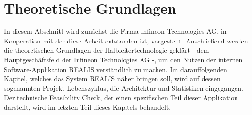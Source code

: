 \chapter{Theoretische Grundlagen}\label{Chap:TheoretischeGrundlagen}
In diesem Abschnitt wird zunächst die Firma Infineon Technologies AG, in Kooperation mit der diese Arbeit entstanden ist, vorgestellt. Anschließend werden die theoretischen Grundlagen der Halbleitertechnologie geklärt - dem Hauptgeschäftsfeld der Infineon Technologies AG -, um den Nutzen der internen Software-Applikation \gls{REALIS} verständlich zu machen. Im darauffolgenden Kapitel, welches das System \gls{REALIS} näher bringen soll, wird auf dessen sogenannten Projekt-Lebenszyklus, die Architektur und Statistiken eingegangen. Der technische Feasibility Check, der einen spezifischen Teil dieser Applikation darstellt, wird im letzten Teil dieses Kapitels behandelt.




